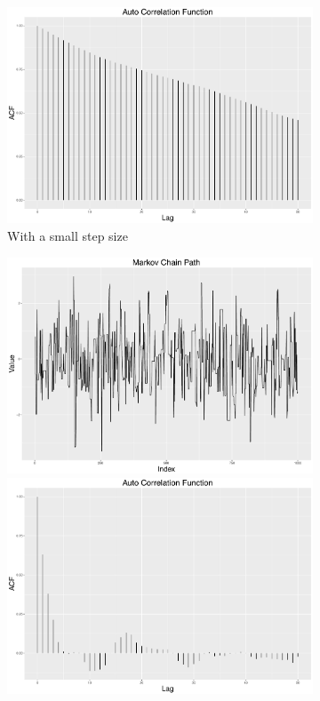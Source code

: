 \begin{figure}[h]
\begin{subfigure}[b]{0.32\textwidth}
    \includegraphics[width=\textwidth]{Chapters/05MCMCOU/plots/ggsmallacf.pdf}
    \caption{With a small step size}\label{MCMCsmallstep}
\end{subfigure}
\begin{subfigure}[b]{0.32\textwidth}
    \includegraphics[width=\textwidth]{Chapters/05MCMCOU/plots/ggbestchain.pdf}
    \includegraphics[width=\textwidth]{Chapters/05MCMCOU/plots/ggbestacf.pdf}

\end{subfigure}
\end{figure}
